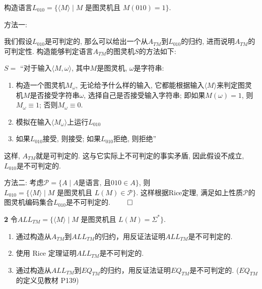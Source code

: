 \documentclass[UTF8]{report}
\newcommand{\problem}[1]{{\setlength{\parskip}{10pt}\noindent \bf{#1}}}
\renewenvironment{proof}{{\setlength{\parskip}{7pt}\noindent\hskip 2em \bf 证明 \quad}}{\hfill$\qed$\par}
\begin{document}
\begin{proof}
    构造语言$L_{010} = \{ \langle M \rangle \mid M \text{ 是图灵机且 } M(010) = 1 \}$.
    
    方法一: 
    
    我们假设$L_{010}$是可判定的, 那么可以给出一个从$A_{TM}$到$L_{010}$的归约, 进而说明$A_{TM}$的可判定性. 构造能够判定语言$A_{TM}$的图灵机$S$的方法如下:

    $S =$ ``对于输入$\langle M, \omega \rangle$, 其中$M$是图灵机, $\omega$是字符串:
    \begin{enumerate}
        \item 构造一个图灵机$M_{\omega}$, 无论给予什么样的输入, 它都能根据输入$\langle M \rangle$来判定图灵机$M$是否接受字符串$\omega$, 选择自己是否接受输入字符串; 即如果$M(\omega) = 1$, 则$M_{\omega} \equiv 1$; 否则$M_{\omega} \equiv 0$.
        \item 模拟在输入$\langle M_{\omega} \rangle$上运行$L_{010}$
        \item 如果$L_{010}$接受, 则接受; 如果$L_{010}$拒绝, 则拒绝''
    \end{enumerate}

    这样, $A_{TM}$就是可判定的. 这与它实际上不可判定的事实矛盾, 因此假设不成立, $L_{010}$是不可判定的.

    方法二: 考虑$\mathcal{P} = \{A \mid A\text{是语言, 且} 010 \in A \}$, 则$L_{010}= \{ \langle M \rangle \mid M \text{ 是图灵机且 } L(M) \in\mathcal{P} \}$. 这样根据Rice定理, 满足如上性质$\mathcal{P}$的图灵机编码集合$L_{010}$是不可判定的.
\end{proof}

\problem{2} 令$ALL_{TM} = \{ \langle M \rangle \mid M \text{ 是图灵机且 } L(M) = \Sigma^* \}$.
\begin{enumerate}[label={(\alph*)}]
    \item 通过构造从$A_{TM}$到$ALL_{TM}$的归约，用反证法证明$ALL_{TM}$是不可判定的.
    \item 使用 Rice 定理证明$ALL_{TM}$是不可判定的.
    \item 通过构造从$ALL_{TM}$到$EQ_{TM}$的归约，用反证法证明$EQ_{TM}$是不可判定的. ($EQ_{TM}$的定义见教材 P139)
\end{enumerate}
\end{document}
